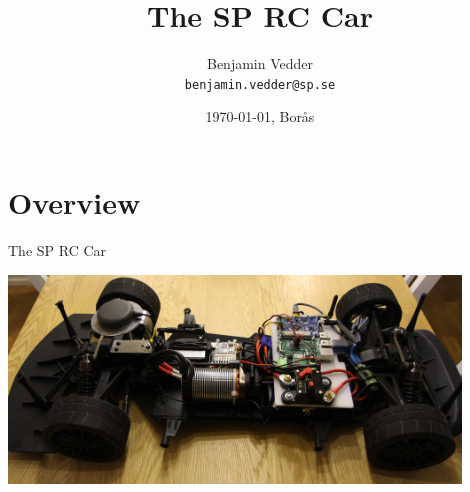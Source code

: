 \documentclass[aspectratio=169,electronics,notopline]{beamer}
\title{The SP RC Car}
\author[Euclid]{Benjamin Vedder\\
\texttt{benjamin.vedder@sp.se}}
\date{\today, Borås}
\begin{document}
\spStartFrame
\maketitle


\section{Overview}

\begin{frame}{The SP RC Car}
\begin{center}
	\includegraphics[width=12cm]{Figures/car_2.jpg}
\end{center}
\end{frame}
\end{document}
